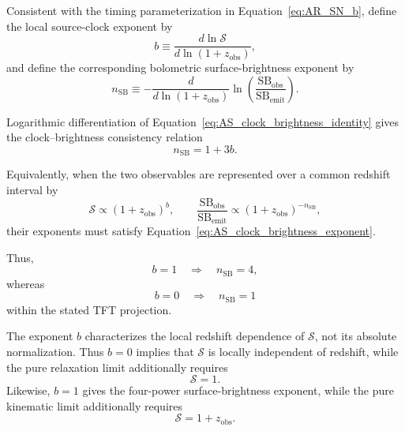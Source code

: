 Consistent with the timing parameterization in
Equation~\eqref{eq:AR_SN_b}, define the local source-clock exponent by
\begin{equation}
    b
    \equiv
    \frac{
        d\ln\mathcal S
    }{
        d\ln(1+z_{\mathrm{obs}})
    },
    \label{eq:AS_clock_exponent}
\end{equation}
and define the corresponding bolometric surface-brightness exponent by
\begin{equation}
    n_{\mathrm{SB}}
    \equiv
    -
    \frac{
        d
    }{
        d\ln(1+z_{\mathrm{obs}})
    }
    \ln
    \left(
        \frac{
            \mathrm{SB}_{\mathrm{obs}}
        }{
            \mathrm{SB}_{\mathrm{emit}}
        }
    \right).
    \label{eq:AS_surface_brightness_exponent}
\end{equation}

Logarithmic differentiation of
Equation~\eqref{eq:AS_clock_brightness_identity}
gives the clock--brightness consistency relation
\begin{equation}
    \boxed{
    n_{\mathrm{SB}}
    =
    1+3b.
    }
    \label{eq:AS_clock_brightness_exponent}
\end{equation}

Equivalently, when the two observables are represented over a common redshift
interval by
\begin{equation}
    \mathcal S
    \propto
    (1+z_{\mathrm{obs}})^b,
    \qquad
    \frac{
        \mathrm{SB}_{\mathrm{obs}}
    }{
        \mathrm{SB}_{\mathrm{emit}}
    }
    \propto
    (1+z_{\mathrm{obs}})^{-n_{\mathrm{SB}}},
\end{equation}
their exponents must satisfy
Equation~\eqref{eq:AS_clock_brightness_exponent}.

Thus,
\begin{equation}
    b=1
    \quad\Longrightarrow\quad
    n_{\mathrm{SB}}=4,
\end{equation}
whereas
\begin{equation}
    b=0
    \quad\Longrightarrow\quad
    n_{\mathrm{SB}}=1
\end{equation}
within the stated TFT projection.

The exponent \(b\) characterizes the local redshift dependence of
\(\mathcal S\), not its absolute normalization. Thus \(b=0\) implies that
\(\mathcal S\) is locally independent of redshift, while the pure
relaxation limit additionally requires
\begin{equation}
    \mathcal S=1.
\end{equation}
Likewise, \(b=1\) gives the four-power surface-brightness exponent, while the
pure kinematic limit additionally requires
\begin{equation}
    \mathcal S
    =
    1+z_{\mathrm{obs}}.
\end{equation}

